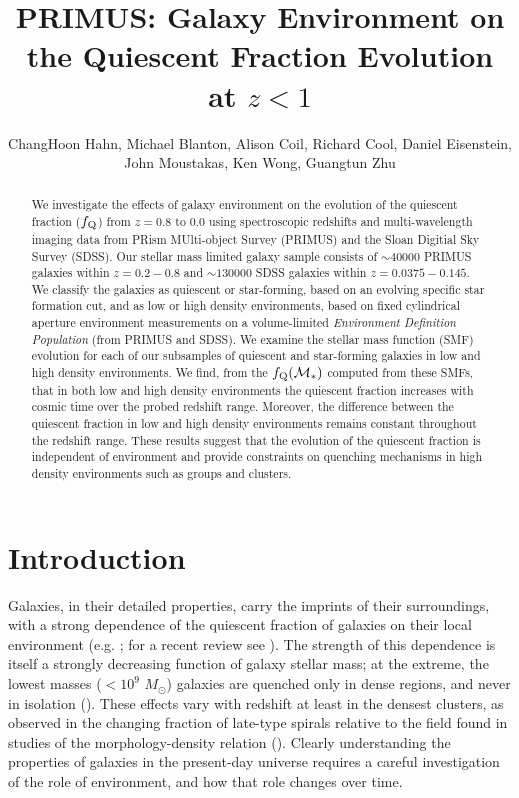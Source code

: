 \documentclass{emulateapj}
\begin{document}
\title{PRIMUS: Galaxy Environment on the Quiescent Fraction Evolution at $z < 1$}
\author{ChangHoon Hahn, Michael Blanton, Alison Coil, Richard Cool, Daniel Eisenstein, John Moustakas, Ken Wong, Guangtun Zhu}

\begin{abstract}
We investigate the effects of galaxy environment on the evolution of the quiescent fraction ($f_{\rm{Q}}$) from $z =0.8 $ to $ 0.0$ using spectroscopic redshifts and multi-wavelength imaging data from PRism MUlti-object Survey (PRIMUS) and the Sloan Digitial Sky Survey (SDSS). Our stellar mass limited galaxy sample consists of $\sim 40000$ PRIMUS galaxies within $z = 0.2-0.8$ and $\sim 130000$ SDSS galaxies within $z = 0.0375-0.145$. We classify the galaxies as quiescent or star-forming, based on an evolving specific star formation cut, and as low or high density environments, based on fixed cylindrical aperture environment measurements on a volume-limited {\em Environment Definition Population} (from PRIMUS and SDSS). We examine the stellar mass function (SMF) evolution for each of our subsamples of quiescent and star-forming galaxies in low and high density environments. We find, from the $f_{\rm{Q}}(\mathcal{M}_{*})$ computed from these SMFs, that in both low and high density environments the quiescent fraction increases with cosmic time over the probed redshift range. Moreover, the difference between the quiescent fraction in low and high density environments remains constant throughout the redshift range. These results suggest that the evolution of the quiescent fraction is independent of environment and provide constraints on quenching mechanisms in high density environments such as groups and clusters.  
\end{abstract}


\section{Introduction}
Galaxies, in their detailed properties, carry the imprints of their
surroundings, with a strong dependence of the quiescent fraction of
galaxies on their local environment (e.g. \citealt{hubble36a,
oemler74a, dressler80a, hermit96a, guzzo97a}; for a recent review see
\citealt{blanton09a}).  The strength of this dependence is itself a
strongly decreasing function of galaxy stellar mass; at the extreme,
the lowest masses ($<10^{9}$ $M_\odot$) galaxies are quenched only in
dense regions, and never in isolation (\citealt{geha12a}).  These
effects vary with redshift at least in the densest clusters, as
observed in the changing fraction of late-type spirals relative to the
field found in studies of the morphology-density relation
(\citealt{dressler84a, desai07a}).  Clearly understanding the
properties of galaxies in the present-day universe requires a careful
investigation of the role of environment, and how that role changes
over time.
\end{document}
